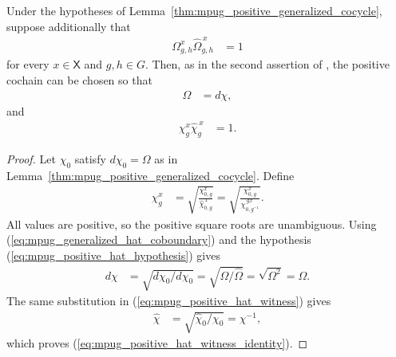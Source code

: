 \begin{lemma}
    \label{thm:mpug_positive_generalized_cocycle_hat}
    \leanok
    Under the hypotheses of
    Lemma~\ref{thm:mpug_positive_generalized_cocycle}, suppose additionally
    that
    \begin{align}
        \Omega^x_{g,h}\widehat\Omega^{\,x}_{g,h}
         & =1
        \label{eq:mpug_positive_hat_hypothesis}
    \end{align}
    for every $x\in\mathsf X$ and $g,h\in G$. Then, as in the second assertion
    of \cite[Corollary at lines~5950--5960]{FrancoRubio2025MPUGauging}, the
    positive cochain can be chosen so that
    \begin{align}
        \Omega & =d\chi,
        \label{eq:mpug_positive_hat_coboundary}
    \end{align}
    and
    \begin{align}
        \chi^x_g\widehat\chi^{\,x}_g
         & =1.
        \label{eq:mpug_positive_hat_witness_identity}
    \end{align}
\end{lemma}

\begin{proof}\leanok
    Let $\chi_0$ satisfy $d\chi_0=\Omega$ as in
    Lemma~\ref{thm:mpug_positive_generalized_cocycle}. Define
    \begin{align}
        \chi^x_g
         & =\sqrt{\frac{\chi^x_{0,g}}
                {\widehat\chi^{\,x}_{0,g}}}
        =\sqrt{\frac{\chi^x_{0,g}}
             {\chi^{\,g x}_{0,g^{-1}}}}.
        \label{eq:mpug_positive_hat_witness}
    \end{align}
    All values are positive, so the positive square roots are unambiguous.
    Using (\ref{eq:mpug_generalized_hat_coboundary}) and the hypothesis
    (\ref{eq:mpug_positive_hat_hypothesis}) gives
    \begin{align}
        d\chi
         & =\sqrt{d\chi_0/d\widehat\chi_0}
        =\sqrt{\Omega/\widehat\Omega}
        =\sqrt{\Omega^2}
        =\Omega.
    \end{align}
    The same substitution in
    (\ref{eq:mpug_positive_hat_witness}) gives
    \begin{align}
        \widehat\chi
         & =\sqrt{\widehat\chi_0/\chi_0}
        =\chi^{-1},
    \end{align}
    which proves
    (\ref{eq:mpug_positive_hat_witness_identity}).
\end{proof}
